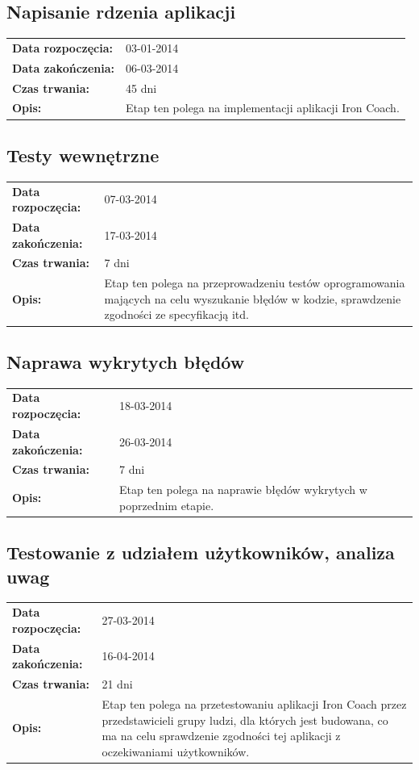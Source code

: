 \subsection{Napisanie rdzenia aplikacji}
	\begin{tabular}{l p{5cm}}
		\textbf{Data rozpoczęcia:} & 03-01-2014\\
		\textbf{Data zakończenia:} & 06-03-2014\\
		\textbf{Czas trwania:} & 45 dni\\
		\textbf{Opis:} & Etap ten polega na implementacji aplikacji Iron Coach.
	\end{tabular}
\subsection{Testy wewnętrzne}
	\begin{tabular}{l p{5cm}}
		\textbf{Data rozpoczęcia:} & 07-03-2014\\
		\textbf{Data zakończenia:} & 17-03-2014\\
		\textbf{Czas trwania:} & 7 dni\\
		\textbf{Opis:} & Etap ten polega na przeprowadzeniu testów oprogramowania mających na celu wyszukanie błędów w kodzie, sprawdzenie zgodności ze specyfikacją itd.
	\end{tabular}
\subsection{Naprawa wykrytych błędów}
	\begin{tabular}{l p{5cm}}
		\textbf{Data rozpoczęcia:} & 18-03-2014\\
		\textbf{Data zakończenia:} & 26-03-2014\\
		\textbf{Czas trwania:} & 7 dni\\
		\textbf{Opis:} & Etap ten polega na naprawie błędów wykrytych w poprzednim etapie.
	\end{tabular}
\subsection{Testowanie z udziałem użytkowników, analiza uwag}
	\begin{tabular}{l p{5cm}}
		\textbf{Data rozpoczęcia:} & 27-03-2014\\
		\textbf{Data zakończenia:} & 16-04-2014\\
		\textbf{Czas trwania:} & 21 dni\\
		\textbf{Opis:} & Etap ten polega na przetestowaniu aplikacji Iron Coach przez przedstawicieli grupy ludzi, dla których jest budowana, co ma na celu sprawdzenie zgodności tej aplikacji z oczekiwaniami użytkowników.
	\end{tabular}
